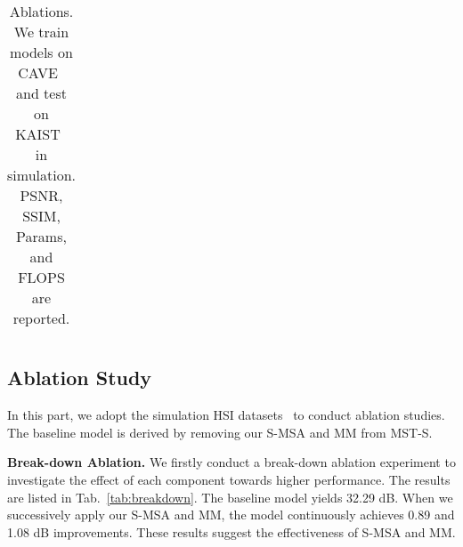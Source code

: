 \documentclass[10pt,twocolumn,letterpaper]{article}
\begin{document}
\begin{table*}[t]
{{\begin{tabular}{l c c c c c c c c c}
				\bottomrule
	\end{tabular}}}\hspace{4mm}
	\vspace{-3mm}
	\caption{\small Ablations. We train models on CAVE~\cite{cave} and test on KAIST~\cite{kaist} in simulation. PSNR, SSIM, Params, and FLOPS are reported.}
	\label{tab:ablations}\vspace{-6mm}
\end{table*}

\vspace{-1.5mm}
\subsection{Ablation Study}
\vspace{-1.5mm}
In this part, we adopt the simulation HSI datasets~\cite{cave,kaist} to conduct ablation studies. The baseline model is derived by removing our S-MSA and MM from MST-S.


\noindent\textbf{Break-down Ablation.} We firstly conduct a break-down ablation experiment to investigate the effect of each component towards higher performance. The results are listed in Tab.~\ref{tab:breakdown}. The baseline model yields 32.29 dB. When we successively apply our S-MSA and MM, the model continuously achieves 0.89 and 1.08 dB improvements. These results suggest the effectiveness of S-MSA and MM.
\end{document}
